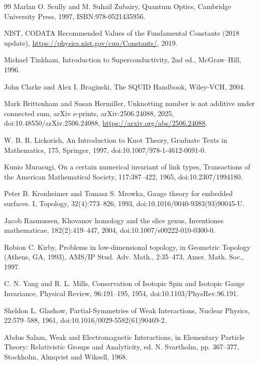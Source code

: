 \documentclass[10pt,reprint,aps,onecolumn,nofootinbib]{revtex4-2}
\begin{document}
\begin{thebibliography}{99}
     Marlan O. Scully and M. Suhail Zubairy, Quantum Optics, Cambridge University Press, 1997, ISBN:978-0521435956.

     NIST, CODATA Recommended Values of the Fundamental Constants (2018 update), \url{https://physics.nist.gov/cuu/Constants/}, 2019.

     Michael Tinkham, Introduction to Superconductivity, 2nd ed., McGraw–Hill, 1996.

     John Clarke and Alex I. Braginski, The SQUID Handbook, Wiley-VCH, 2004.

     Mark Brittenham and Susan Hermiller, Unknotting number is not additive under connected sum, arXiv e-prints, arXiv:2506.24088, 2025, doi:10.48550/arXiv.2506.24088, \url{https://arxiv.org/abs/2506.24088}.

     W. B. R. Lickorish, An Introduction to Knot Theory, Graduate Texts in Mathematics, 175, Springer, 1997, doi:10.1007/978-1-4612-0691-0.

     Kunio Murasugi, On a certain numerical invariant of link types, Transactions of the American Mathematical Society, 117:387--422, 1965, doi:10.2307/1994180.

     Peter B. Kronheimer and Tomasz S. Mrowka, Gauge theory for embedded surfaces. I, Topology, 32(4):773--826, 1993, doi:10.1016/0040-9383(93)90045-U.

     Jacob Rasmussen, Khovanov homology and the slice genus, Inventiones mathematicae, 182(2):419--447, 2004, doi:10.1007/s00222-010-0300-0.

     Robion C. Kirby, Problems in low-dimensional topology, in Geometric Topology (Athens, GA, 1993), AMS/IP Stud. Adv. Math., 2:35--473, Amer. Math. Soc., 1997.

     C. N. Yang and R. L. Mills, Conservation of Isotopic Spin and Isotopic Gauge Invariance, Physical Review, 96:191--195, 1954, doi:10.1103/PhysRev.96.191.

     Sheldon L. Glashow, Partial-Symmetries of Weak Interactions, Nuclear Physics, 22:579--588, 1961, doi:10.1016/0029-5582(61)90469-2.

     Abdus Salam, Weak and Electromagnetic Interactions, in Elementary Particle Theory: Relativistic Groups and Analyticity, ed. N. Svartholm, pp. 367--377, Stockholm, Almqvist and Wiksell, 1968.


\end{thebibliography}
\end{document}
